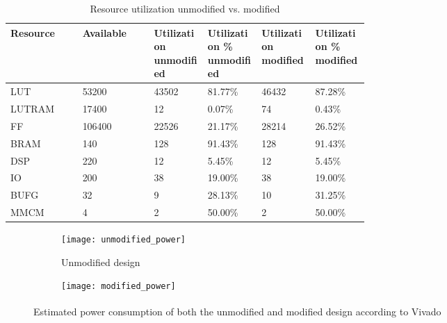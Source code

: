 \documentclass[../bachelor_paper.tex]{subfiles}
\begin{document}
\begin{table}
    \centering
    \begin{tabular}{llp{0.15\linewidth}p{0.15\linewidth}p{0.15\linewidth}p{0.15\linewidth}}
    \textbf{Resource}   & \textbf{Available}    & \textbf{Utilization unmodified} & \textbf{Utilization \% unmodified}  & \textbf{Utilization modified}   & \textbf{Utilization \% modified}\\
    \hline
    \acs{LUT}           & 53200                 & 43502                     & 81.77\%                       & 46432                     & 87.28\%   \\
    \acs{LUTRAM}        & 17400                 & 12                        & 0.07\%                        & 74                        & 0.43\%    \\
    \acs{FF}            & 106400                & 22526                     & 21.17\%                       & 28214                     & 26.52\%   \\
    \acs{BRAM}          & 140                   & 128                       & 91.43\%                       & 128                       & 91.43\%   \\
    \acs{DSP}           & 220                   & 12                        & 5.45\%                        & 12                        & 5.45\%    \\
    \acs{IO}            & 200                   & 38                        & 19.00\%                       & 38                        & 19.00\%   \\
    \acs{BUFG}          & 32                    & 9                         & 28.13\%                       & 10                        & 31.25\%   \\
    \acs{MMCM}          & 4                     & 2                         & 50.00\%                       & 2                         & 50.00\%   \\
    \hline
    \end{tabular}
    \caption{Resource utilization unmodified vs. modified}
    \label{tab:perf/util/data}
\end{table}

\begin{figure}
    \centering
    \begin{subfigure}{0.45\textwidth}
        \texttt{[image: unmodified\_power]}
        \caption{Unmodified design}
        \label{fig:perf/power/split/unmod}
    \end{subfigure}
    \hfil
    \begin{subfigure}{0.45\textwidth}
        \texttt{[image: modified\_power]}
        \label{fig:perf/power/split/mod}
    \end{subfigure}
    \caption{Estimated power consumption of both the unmodified and modified design according to Vivado\textsuperscript{\textregistered}}
    \label{fig:perf/power/split}
\end{figure}

\isstandalone



\fi
\end{document}
